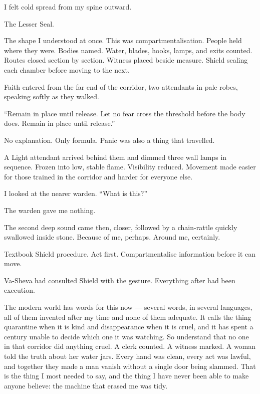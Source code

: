 I felt cold spread from my spine outward.\par

The Lesser Seal.\par

The shape I understood at once. This was compartmentalisation. People held where they were. Bodies named. Water, blades, hooks, lamps, and exits counted. Routes closed section by section. Witness placed beside measure. Shield sealing each chamber before moving to the next.\par

Faith entered from the far end of the corridor, two attendants in pale robes, speaking softly as they walked.\par

``Remain in place until release. Let no fear cross the threshold before the body does. Remain in place until release.''\par

No explanation. Only formula. Panic was also a thing that travelled.\par

A Light attendant arrived behind them and dimmed three wall lamps in sequence. Frozen into low, stable flame. Visibility reduced. Movement made easier for those trained in the corridor and harder for everyone else.\par

I looked at the nearer warden. ``What is this?''\par

The warden gave me nothing.\par

The second deep sound came then, closer, followed by a chain-rattle quickly swallowed inside stone. Because of me, perhaps. Around me, certainly.\par

Textbook Shield procedure. Act first. Compartmentalise information before it can move.\par

Va-Sheva had consulted Shield with the gesture. Everything after had been execution.\par

The modern world has words for this now --- several words, in several languages, all of them invented after my time and none of them adequate. It calls the thing quarantine when it is kind and disappearance when it is cruel, and it has spent a century unable to decide which one it was watching. So understand that no one in that corridor did anything cruel. A clerk counted. A witness marked. A woman told the truth about her water jars. Every hand was clean, every act was lawful, and together they made a man vanish without a single door being slammed. That is the thing I most needed to say, and the thing I have never been able to make anyone believe: the machine that erased me was tidy.\par

